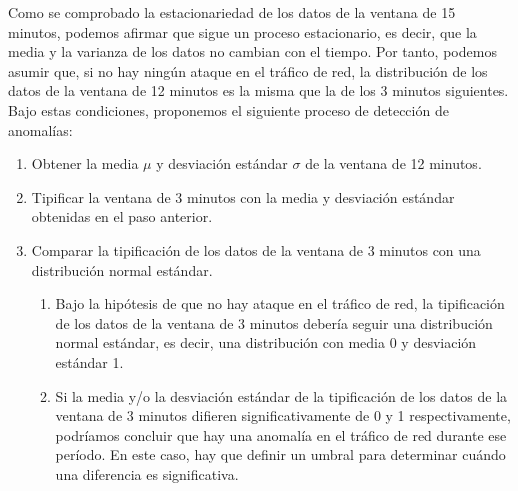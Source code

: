 Como se comprobado la estacionariedad de los datos de la ventana de 15 minutos, podemos afirmar que sigue un proceso estacionario, es decir, que la media y la varianza de los datos no cambian con el tiempo. Por tanto, podemos asumir que, si no hay ningún ataque en el tráfico de red, la distribución de los datos de la ventana de 12 minutos es la misma que la de los 3 minutos siguientes.
Bajo estas condiciones, proponemos el siguiente proceso de detección de anomalías:
\begin{enumerate}
    \item Obtener la media $\mu$ y desviación estándar $\sigma$ de la ventana de 12 minutos.
    \item Tipificar la ventana de 3 minutos con la media y desviación estándar obtenidas en el paso anterior.
    \item Comparar la tipificación de los datos de la ventana de 3 minutos con una distribución normal estándar.
    
    \begin{enumerate}
        \item Bajo la hipótesis de que no hay ataque en el tráfico de red, la tipificación de los datos de la ventana de 3 minutos debería seguir una distribución normal estándar, es decir, una distribución con media 0 y desviación estándar 1.
        \item Si la media y/o la desviación estándar de la tipificación de los datos de la ventana de 3 minutos difieren significativamente de 0 y 1 respectivamente, podríamos concluir que hay una anomalía en el tráfico de red durante ese período. En este caso, hay que definir un umbral para determinar cuándo una diferencia es significativa.
    \end{enumerate}
\end{enumerate}

